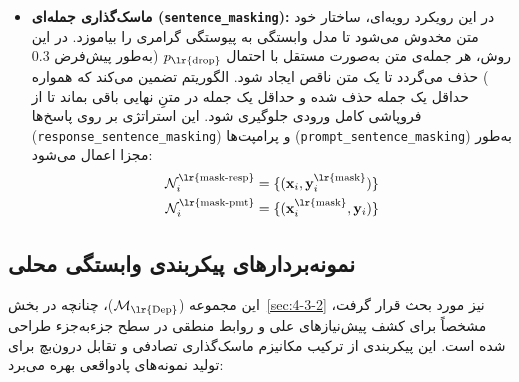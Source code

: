 \begin{itemize}
    \item \textbf{ماسک‌گذاری جمله‌ای (\texttt{sentence\_masking}):}
    در این رویکرد رویه‌ای، ساختار خود متن مخدوش می‌شود تا مدل وابستگی به پیوستگی گرامری را بیاموزد. در این روش، هر جمله‌ی متن به‌صورت مستقل با احتمال $p_{\text{\lr{drop}}}$ (به‌طور پیش‌فرض $0.3$) حذف می‌گردد تا یک متن ناقص ایجاد شود. الگوریتم تضمین می‌کند که همواره حداقل یک جمله حذف شده و حداقل یک جمله در متنِ نهایی باقی بماند تا از فروپاشی کامل ورودی جلوگیری شود. این استراتژی بر روی پاسخ‌ها (\texttt{response\_sentence\_masking}) و پرامپت‌ها (\texttt{prompt\_sentence\_masking}) به‌طور مجزا اعمال می‌شود:
    \begin{align}
        \mathcal{N}^{\text{\lr{mask-resp}}}_i &= \{ (\mathbf{x}_i, \mathbf{y}^{\text{\lr{mask}}}_i) \} \\
        \mathcal{N}^{\text{\lr{mask-pmt}}}_i &= \{ (\mathbf{x}^{\text{\lr{mask}}}_i, \mathbf{y}_i) \}
    \end{align}
\end{itemize}


\subsection{نمونه‌بردارهای پیکربندی وابستگی محلی}

این مجموعه ($\mathcal{M}_{\text{\lr{Dep}}}$)، چنانچه در بخش~\ref{sec:4-3-2} نیز مورد بحث قرار گرفت، مشخصاً برای کشف پیش‌نیازهای علی و روابط منطقی در سطح جزء‌به‌جزء طراحی شده است. این پیکربندی از ترکیب مکانیزم ماسک‌گذاری تصادفی و تقابل درون‌بچ برای تولید نمونه‌های پادواقعی بهره می‌برد:

